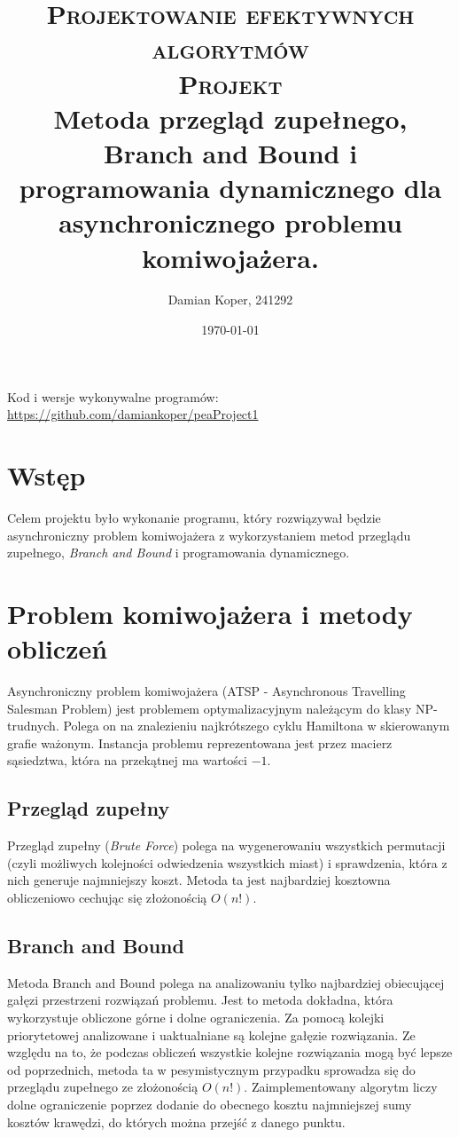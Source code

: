 \documentclass[12pt]{article}
\title{ 
    \vspace*{50mm}
    \textsc{
        \textbf{Projektowanie efektywnych algorytmów}\\
    \vspace*{10mm}
    \large Projekt\\
        }
        \normalsize
         Metoda przegląd zupełnego, Branch and Bound i programowania dynamicznego dla asynchronicznego problemu komiwojażera. 
         \vspace*{5mm}
         }
\author{
Damian Koper,  241292\\
}
\date{\today}
\begin{document}
\maketitle

\newpage
\setcounter{tocdepth}{2}
\localtableofcontents
\listoffigures
\listoftables
\vfill
Kod i wersje wykonywalne programów: \url{https://github.com/damiankoper/peaProject1}
\newpage

\section{Wstęp}
Celem projektu było wykonanie programu, który rozwiązywał będzie asynchroniczny
problem komiwojażera z wykorzystaniem metod przeglądu zupełnego,
\textit{Branch and Bound} i programowania dynamicznego.
\section{Problem komiwojażera i metody obliczeń}
Asynchroniczny problem komiwojażera (ATSP - Asynchronous Travelling Salesman Problem) jest problemem optymalizacyjnym należącym do klasy NP-trudnych.
Polega on na znalezieniu najkrótszego cyklu Hamiltona w skierowanym grafie ważonym. Instancja problemu reprezentowana jest przez macierz sąsiedztwa, która na
przekątnej ma wartości $-1$.
\subsection{Przegląd zupełny}
Przegląd zupełny (\textit{Brute Force}) polega na wygenerowaniu wszystkich permutacji (czyli możliwych kolejności odwiedzenia wszystkich miast) i sprawdzenia,
która z nich generuje najmniejszy koszt. Metoda ta jest najbardziej kosztowna obliczeniowo cechując się złożonością $O(n!)$.

\subsection{Branch and Bound}
Metoda Branch and Bound polega na analizowaniu tylko najbardziej obiecującej gałęzi przestrzeni rozwiązań problemu. Jest to metoda dokładna, która wykorzystuje obliczone górne i dolne ograniczenia. Za pomocą kolejki priorytetowej analizowane i uaktualniane są kolejne gałęzie rozwiązania. Ze względu na to, że podczas obliczeń wszystkie kolejne rozwiązania mogą być lepsze od poprzednich, metoda ta w pesymistycznym przypadku sprowadza się do przeglądu zupełnego ze złożonością $O(n!)$.
Zaimplementowany algorytm liczy dolne ograniczenie poprzez dodanie do obecnego kosztu najmniejszej sumy kosztów krawędzi, do których można przejść z danego punktu.
\end{document}

